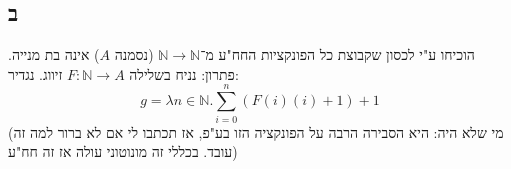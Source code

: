 \documentclass[]{article}
\newcommand\N     {\mathbb{N}}
\begin{document}
	\subsection*{ב}
	הוכיחו ע"י לכסון שקבוצת כל הפונקציות החח"ע מ־$ \N \to \N $ (נסמנה $ A $) אינה בת מנייה. 
	פתרון: נניח בשלילה $ F \colon \N \to A $ זיווג. נגדיר: 
	\[ g = \lambda n \in \N. \sum_{i = 0}^{n} (F(i)(i) + 1) + 1 \]
	(מי שלא היה: היא הסבירה הרבה על הפונקציה הזו בע"פ, אז תכתבו לי אם לא ברור למה זה עובד. בכללי זה מונוטוני עולה אז זה חח"ע)
\end{document}
